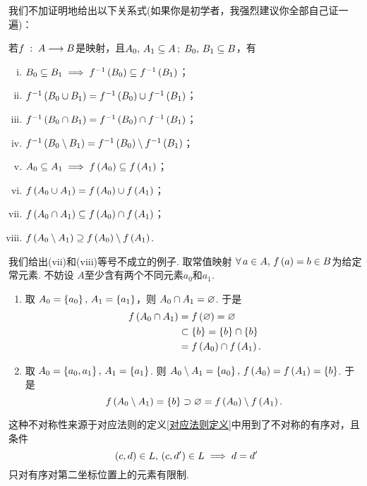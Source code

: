 \begin{proposition}
    我们不加证明地给出以下关系式(如果你是初学者，我强烈建议你全部自己证一遍)：

    若$f\;:\;A\ra B$是映射，且$A_0,\,A_1\sb A\,;\;B_0,\,B_1\sb B$，有
    \begin{enumerate}[(i)]
        \item $B_0\sb B_1 \implies f\inv\z(B_0\y) \sb f\inv\z(B_1\y)$；
        \item $f\inv \z(  B_0\cup B_1  \y)= f\inv\z(B_0\y)\cup f\inv\z(B_1\y)$；
        \item $f\inv \z(  B_0\cap B_1  \y)= f\inv\z(B_0\y)\cap f\inv\z(B_1\y)$；
        \item $f\inv \z(  B_0\m B_1  \y)= f\inv\z(B_0\y)\m f\inv\z(B_1\y)$；
        \item $A_0\sb A_1 \implies f\z(A_0\y)\sb f\z(A_1\y)$；
        \item $f\z(A_0\cup A_1\y)=f\z(A_0\y)\cup f\z(A_1\y)$；
        \item $f\z(A_0\cap A_1\y)\sb f\z(A_0\y)\cap f\z(A_1\y)$；
        \item $f\z(A_0\m A_1\y)\sp f\z(A_0\y)\m f\z(A_1\y)$.
    \end{enumerate}
\end{proposition}
\begin{example}
    我们给出(vii)和(viii)等号不成立的例子. 取常值映射 $\forall\, a\in A,\,f\z(a\y)=b\in B$为给定常元素. 不妨设 $A$至少含有两个不同元素$a_0$和$a_1$.
    \begin{enumerate}
        \item 取 $A_0=\z\{a_0\y\},\,A_1=\z\{a_1\y\}$，则 $A_0\cap A_1=\vd$. 于是
        \begin{align*}
            f\z(A_0\cap A_1\y) &= f\z(\vd\y)=\vd \\
            &\subset \z\{b\y\}=\z\{b\y\}\cap\z\{b\y\} \\
            &= f\z(A_0\y) \cap f\z(A_1\y).
        \end{align*}
        \item 取 $A_0=\z\{a_0,a_1\y\},\,A_1=\z\{a_1\y\}$. 则 $A_0\m A_1=\z\{a_0\y\},\,f\z(A_0\y)=f\z(A_1\y)=\z\{b\y\}$. 于是
        \[   f\z(A_0\m A_1\y)=\z\{b\y\}\supset\vd=f\z(A_0\y)\m f\z(A_1\y).  \]
    \end{enumerate}
\end{example}
\begin{remark}
    这种不对称性来源于对应法则的定义\ref{对应法则定义}中用到了不对称的有序对，且条件\[\z(c,d\y)\in L,\,\z(c,d'\y)\in L \implies d=d'\]只对有序对第二坐标位置上的元素有限制.
\end{remark}

